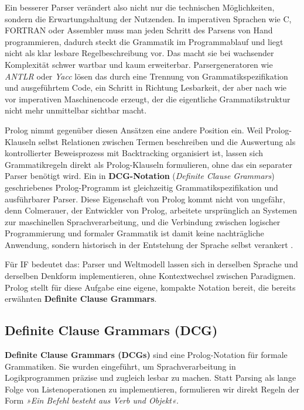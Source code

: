 \documentclass[parskip=half,a4paper,11pt]{scrreprt}
\begin{document}
Ein besserer Parser verändert also nicht nur die technischen Möglichkeiten, sondern die Erwartungshaltung der Nutzenden. In imperativen Sprachen wie C, FORTRAN oder Assembler muss man jeden Schritt des Parsens von Hand programmieren, dadurch steckt die Grammatik im Programmablauf und liegt nicht als klar lesbare Regelbeschreibung vor. Das macht sie bei wachsender Komplexität schwer wartbar und kaum erweiterbar. Parsergeneratoren wie \textit{ANTLR} oder \textit{Yacc} lösen das durch eine Trennung von Grammatikspezifikation und ausgeführtem Code, ein Schritt in Richtung Lesbarkeit, der aber nach wie vor imperativen Maschinencode erzeugt, der die eigentliche Grammatikstruktur nicht mehr unmittelbar sichtbar macht.

Prolog nimmt gegenüber diesen Ansätzen eine andere Position ein. Weil Prolog-Klauseln selbst Relationen zwischen Termen beschreiben und die Auswertung als kontrollierter Beweisprozess mit Backtracking organisiert ist, lassen sich Grammatikregeln direkt als Prolog-Klauseln formulieren, ohne das ein separater Parser benötigt wird. Ein in \textbf{DCG-Notation} (\textit{Definite Clause Grammars}) geschriebenes Prolog-Programm ist gleichzeitig Grammatikspezifikation und ausführbarer Parser. Diese Eigenschaft von Prolog kommt nicht von ungefähr, denn Colmerauer, der Entwickler von Prolog, arbeitete ursprünglich an Systemen zur maschinellen Sprachverarbeitung, und die Verbindung zwischen logischer Programmierung und formaler Grammatik ist damit keine nachträgliche Anwendung, sondern historisch in der Entstehung der Sprache selbst verankert \citep{Colmerauer1996}. 

Für IF bedeutet das: Parser und Weltmodell lassen sich in derselben Sprache und derselben Denkform implementieren, ohne Kontextwechsel zwischen Paradigmen. Prolog stellt für diese Aufgabe eine eigene, kompakte Notation bereit, die bereits erwähnten \textbf{Definite Clause Grammars}.

\subsection{Definite Clause Grammars (DCG)}

\textbf{Definite Clause Grammars (DCGs)} sind eine Prolog-Notation für formale Grammatiken. Sie wurden eingeführt, um Sprachverarbeitung in Logikprogrammen präzise und zugleich lesbar zu machen. Statt Parsing als lange Folge von Listenoperationen zu implementieren, formulieren wir direkt Regeln der Form \textit{»Ein Befehl besteht aus Verb und Objekt«}.
\end{document}

